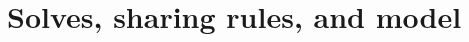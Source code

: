 \documentclass[12pt,english]{article}
\theoremstyle{remark}
\begin{document}



\section{Solves, sharing rules, and model}
\label{app:variants}
\end{document}

